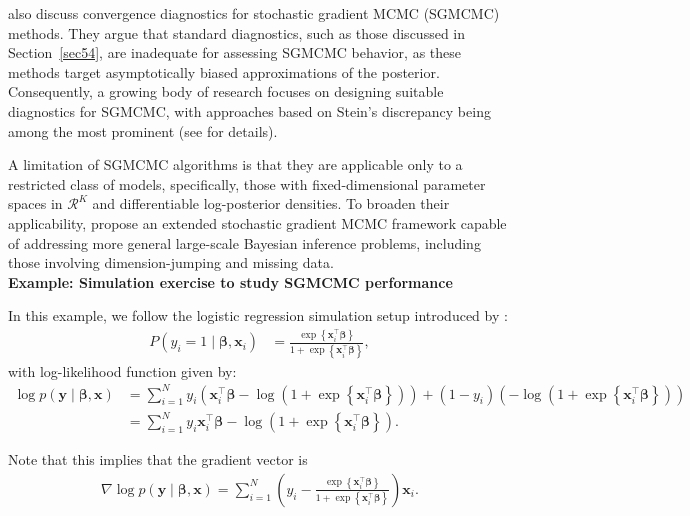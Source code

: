 \cite{nemeth2021stochastic} also discuss convergence diagnostics for stochastic gradient MCMC (SGMCMC) methods. They argue that standard diagnostics, such as those discussed in Section~\ref{sec54}, are inadequate for assessing SGMCMC behavior, as these methods target asymptotically biased approximations of the posterior. Consequently, a growing body of research focuses on designing suitable diagnostics for SGMCMC, with approaches based on Stein's discrepancy being among the most prominent (see \cite{nemeth2021stochastic} for details).

A limitation of SGMCMC algorithms is that they are applicable only to a restricted class of models, specifically, those with fixed-dimensional parameter spaces in \( \mathcal{R}^K \) and differentiable log-posterior densities. To broaden their applicability, \cite{song2020extended} propose an extended stochastic gradient MCMC framework capable of addressing more general large-scale Bayesian inference problems, including those involving dimension-jumping and missing data.\\

\textbf{Example: Simulation exercise to study SGMCMC performance}

In this example, we follow the logistic regression simulation setup introduced by \cite{nemeth2021stochastic}:
\begin{align*}
	P(y_i = 1 \mid \boldsymbol{\beta}, \mathbf{x}_i) &= \frac{\exp\left\{\mathbf{x}_i^{\top} \boldsymbol{\beta}\right\}}{1 + \exp\left\{\mathbf{x}_i^{\top} \boldsymbol{\beta}\right\}},
\end{align*}
with log-likelihood function given by:
\begin{align*}
	\log p(\mathbf{y} \mid \boldsymbol{\beta}, \mathbf{x}) 
	&= \sum_{i=1}^N y_i \left( \mathbf{x}_i^{\top} \boldsymbol{\beta} - \log \left(1 + \exp\left\{\mathbf{x}_i^{\top} \boldsymbol{\beta}\right\} \right) \right) 
	+ (1 - y_i) \left( - \log \left(1 + \exp\left\{\mathbf{x}_i^{\top} \boldsymbol{\beta}\right\} \right) \right) \\
	&= \sum_{i=1}^N y_i \mathbf{x}_i^{\top} \boldsymbol{\beta} - \log \left(1 + \exp\left\{\mathbf{x}_i^{\top} \boldsymbol{\beta}\right\} \right).
\end{align*}

Note that this implies that the gradient vector is
\begin{align*}
	\nabla \log p(\mathbf{y} \mid \boldsymbol{\beta}, \mathbf{x}) = \sum_{i=1}^N \left(y_i - \frac{\exp\left\{\mathbf{x}_i^{\top} \boldsymbol{\beta}\right\}}{1+\exp\left\{\mathbf{x}_i^{\top} \boldsymbol{\beta}\right\}}\right)\mathbf{x}_i. 
\end{align*}

